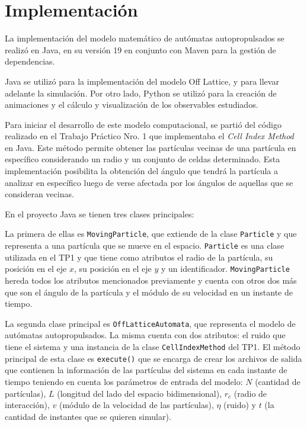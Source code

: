 \documentclass[11pt, a4paper]{article}
\begin{document}
    \newpage

    \section{Implementación}
    \label{sec:implementacion}

        La implementación del modelo matemático de autómatas autopropulsados se realizó en Java, en su versión 19 en
        conjunto con Maven para la gestión de dependencias.

        Java se utilizó para la implementación del modelo Off Lattice, y para llevar adelante la simulación.
        Por otro lado, Python se utilizó para la creación de animaciones y el cálculo y visualización de los observables
        estudiados.

        Para iniciar el desarrollo de este modelo computacional, se partió del código realizado en el Trabajo Práctico Nro. 1 que
        implementaba el \textit{Cell Index Method} en Java.
        Este método permite obtener las partículas vecinas de una partícula en específico considerando un radio y un conjunto de celdas determinado.
        Esta implementación posibilita la obtención del ángulo que tendrá la partícula a analizar en específico luego de verse afectada por los ángulos de aquellas que se consideran vecinas.

        En el proyecto Java se tienen tres clases principales:

        La primera de ellas es \texttt{MovingParticle}, que extiende de la clase \texttt{Particle} y que representa a una
        partícula que se mueve en el espacio.
        \texttt{Particle} es una clase utilizada en el TP1 y que tiene como atributos el radio de la partícula, su posición en el eje $x$, su posición en el eje $y$ y un
        identificador. \texttt{MovingParticle} hereda todos los atributos mencionados previamente y cuenta con otros dos más que son
        el ángulo de la partícula y el módulo de su velocidad en un instante de tiempo.

        La segunda clase principal es \texttt{OffLatticeAutomata}, que representa el modelo de autómatas autopropulsados.
        La misma cuenta con dos atributos: el ruido que tiene el sistema y una instancia de la clase \texttt{CellIndexMethod} del TP1.
        El método principal de esta clase es \texttt{execute()} que se encarga de crear los archivos de salida que contienen la información de las partículas del sistema
        en cada instante de tiempo teniendo en cuenta los parámetros de entrada del modelo: $N$ (cantidad de partículas), $L$ (longitud
        del lado del espacio bidimensional), $r_c$ (radio de interacción), $v$ (módulo de la velocidad de las partículas), $\eta$ (ruido) y
        $t$ (la cantidad de instantes que se quieren simular).
\end{document}
